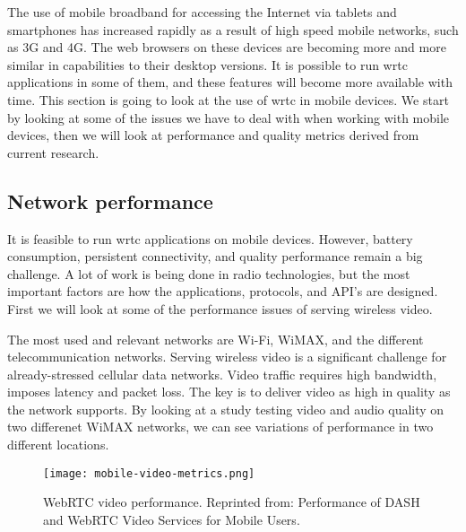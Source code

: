 
The use of mobile broadband for accessing the Internet via tablets and smartphones has increased rapidly as a result of high speed mobile networks, such as 3G and 4G. The web browsers on these devices are becoming more and more similar in capabilities to their desktop versions. It is possible to run \gls{wrtc} applications in some of them, and these features will become more available with time. This section is going to look at the use of \gls{wrtc} in mobile devices. We start by looking at some of the issues we have to deal with when working with mobile devices, then we will look at performance and quality metrics derived from current research.

\subsection{Network performance}
It is feasible to run \gls{wrtc} applications on mobile devices. However, battery consumption, persistent connectivity, and quality performance remain a big challenge. A lot of work is being done in radio technologies, but the most important factors are how the applications, protocols, and API's are designed\cite{isomaki2012considerations}. First we will look at some of the performance issues of serving wireless video.

The most used and relevant networks are Wi-Fi, WiMAX, and the different telecommunication networks. Serving wireless video is a significant challenge for already-stressed cellular data networks\cite{erman2011over}. Video traffic requires high bandwidth, imposes latency and packet loss. The key is to deliver video as high in quality as the network supports. By looking at a study testing video and audio quality on two differenet WiMAX networks\cite{fund2013performance}, we can see variations of performance in two different locations.

\pagebreak
\begin{figure}[here]
\centerline{\texttt{[image: mobile-video-metrics.png]}}
\caption{WebRTC video performance. Reprinted from: Performance of DASH and WebRTC Video Services for Mobile Users\cite{fund2013performance}.}
\label{fig:mobile-video-metrics}
\end{figure}

